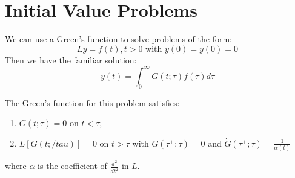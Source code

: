 \documentclass[../Main.tex]{subfiles}
\begin{document}
\section{Initial Value Problems}
We can use a Green's function to solve problems of the form:
\begin{equation*}
    Ly = f(t), t > 0 \text{ with } y(0) = \dot{y}(0) = 0
\end{equation*}
Then we have the familiar solution:
\begin{equation*}
    y(t) = \int_{0}^{\infty} G(t;\tau)f(\tau) d\tau 
\end{equation*}
\begin{proposition}
    The Green's function for this problem satisfies:
    \begin{enumerate}
        \item $G(t;\tau) = 0$ on $t < \tau$,
        \item $L[G(t;/tau)] = 0$ on $t > \tau$ with $G(\tau^+;\tau) = 0$ and $\dot{G}(\tau^+;\tau) = \frac{1}{\alpha(t)}$
    \end{enumerate}
    where $\alpha$ is the coefficient of $\frac{d^{2}}{dt^{2}}$ in $L$.
    \label{propGreenIVP}
\end{proposition}
\end{document}
